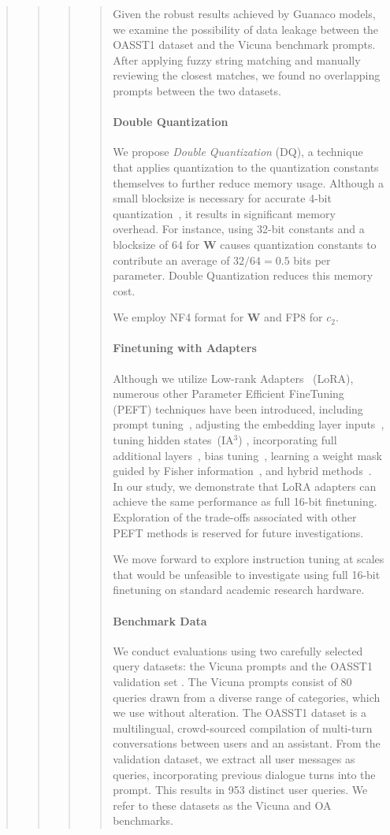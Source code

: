 \begin{quote}
\begin{quote}
\begin{quote}
\begin{quote}
Given the robust results achieved by {Guanaco} models, we examine the possibility of data leakage between the OASST1 dataset and the Vicuna benchmark prompts. After applying fuzzy string matching and manually reviewing the closest matches, we found no overlapping prompts between the two datasets.

\paragraph{Double Quantization{}} 
We propose \emph{Double Quantization} (DQ), a technique that applies quantization to the quantization constants themselves to further reduce memory usage. Although a small blocksize is necessary for accurate 4-bit quantization~\citep{dettmers2022case}, it results in significant memory overhead. For instance, using 32-bit constants and a blocksize of 64 for $\mathbf{W}$ causes quantization constants to contribute an average of $32/64 = 0.5$ bits per parameter. Double Quantization reduces this memory cost.

We employ NF4 format for $\mathbf{W}$ and FP8 for $c_2$.

\paragraph{Finetuning with Adapters} Although we utilize Low-rank Adapters~\citep{hu2021lora} (LoRA), numerous other Parameter Efficient FineTuning (PEFT) techniques have been introduced, including prompt tuning~\citep{qin2021learning,lester2021power,li2021prefix}, adjusting the embedding layer inputs~\citep{an2022input}, tuning hidden states~(IA$^3$) \citep{liu2022few}, incorporating full additional layers~\citep{houlsby2019parameter}, bias tuning~\citep{zaken2021bitfit}, learning a weight mask guided by Fisher information~\citep{sung2021training}, and hybrid methods~\citep{henderson2021compacter}. In our study, we demonstrate that LoRA adapters can achieve the same performance as full 16-bit finetuning. Exploration of the trade-offs associated with other PEFT methods is reserved for future investigations.

We move forward to explore instruction tuning at scales that would be unfeasible to investigate using full 16-bit finetuning on standard academic research hardware.

\paragraph{Benchmark Data} We conduct evaluations using two carefully selected query datasets: the Vicuna prompts \citep{vicuna2023} and the OASST1 validation set \citep{kopf2023openassistant}. The Vicuna prompts consist of 80 queries drawn from a diverse range of categories, which we use without alteration. The OASST1 dataset is a multilingual, crowd-sourced compilation of multi-turn conversations between users and an assistant. From the validation dataset, we extract all user messages as queries, incorporating previous dialogue turns into the prompt. This results in 953 distinct user queries. We refer to these datasets as the Vicuna and OA benchmarks.


\end{quote}
\end{quote}
\end{quote}
\end{quote}
